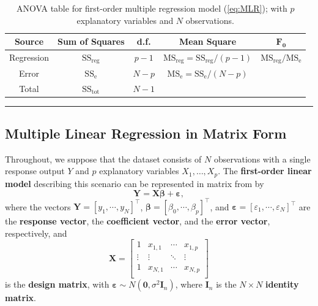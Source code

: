  \begin{table}[!t]
         \centering
         \begin{tabular}{c c c c c}
         \hline
        \textbf{Source} & \textbf{Sum of Squares} & \textbf{d.f.} & \textbf{Mean Square} & $\mathbf{F_{0}}$ \\
         \hline
         Regression & $\text{SS}_{\textrm{reg}}$ & $p-1$ & $\text{MS}_{\textrm{reg}}=\text{SS}_{\textrm{reg}}/(p-1)$ & $\text{MS}_{\textrm{reg}}/\text{MS}_{\textrm{e}}$\\
         Error & $\text{SS}_{\textrm{e}}$ & $N-p$ & $\text{MS}_{\textrm{e}}=\text{SS}_{\textrm{e}}/(N-p)$ \\
         Total & $\text{SS}_{\textrm{tot}}$ & $N-1$\\
        \hline
         \end{tabular}
         \caption[\small ANOVA table for first-order multiple regression]{\small ANOVA table for first-order multiple regression model (\ref{eq:MLR}); with $p$ explanatory variables and $N$ observations. }
         \label{tab:SA4}\hrule
     \end{table}
\subsection{Multiple Linear Regression in Matrix Form}
Throughout, we suppose that the dataset consists of $N$ observations with a single response output $Y$ and $p$ explanatory variables $X_1,\ldots,X_p$. The \textbf{first-order linear model} describing this scenario can be represented in matrix from by 
\begin{equation}\label{eq:MLR}
    \bm{Y}=\bm{X\beta}+\bm{\varepsilon},
\end{equation}
where the vectors $\bm{Y}=[y_{1},\cdots,y_{N}]^{\!\top}$, $\bm{\beta}=[\beta_{0},\cdots,\beta_{p}]^{\!\top}$, and $\bm{\varepsilon}=[\varepsilon_{1},\cdots,\varepsilon_{N}]^{\!\top}$ are the \textbf{response vector},  the \textbf{coefficient vector}, and  the \textbf{error vector}, respectively, and 
$$
 \bm{X} =  
    \begin{bmatrix}
    1 & x_{1,1} & \cdots & x_{1,p}\\
    \vdots & \vdots & \ddots & \vdots\\
    1 & x_{N,1} & \cdots & x_{N,p}\\
    \end{bmatrix}  
$$
is the \textbf{design matrix}, with $\bm{\varepsilon}\sim N(\bm{0}, \sigma^{2}\bm{I}_n)$, where $\bm{I}_n$ is the $N \times N$ \textbf{identity matrix}. 
 
